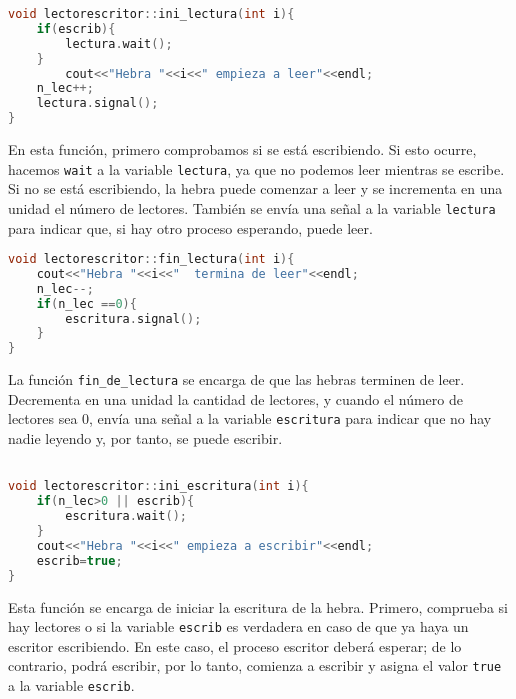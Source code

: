 \documentclass{article}
\begin{document}
\begin{lstlisting}[language=C++,caption=función inicio de lectura] 
void lectorescritor::ini_lectura(int i){
	if(escrib){
		lectura.wait();
	}
		cout<<"Hebra "<<i<<" empieza a leer"<<endl;
	n_lec++;
	lectura.signal();
}
\end{lstlisting}

En esta función, primero comprobamos si se está escribiendo. Si esto ocurre, hacemos \texttt{wait} a la variable \texttt{lectura}, ya que no podemos leer mientras se escribe. Si no se está escribiendo, la hebra puede comenzar a leer y se incrementa en una unidad el número de lectores. También se envía una señal a la variable \texttt{lectura} para indicar que, si hay otro proceso esperando, puede leer.

\begin{lstlisting}[language=C++,caption=función fin de lectura] 
void lectorescritor::fin_lectura(int i){
	cout<<"Hebra "<<i<<"  termina de leer"<<endl;
	n_lec--;
	if(n_lec ==0){
		escritura.signal();
	}
}
\end{lstlisting}
La función \texttt{fin\_de\_lectura} se encarga de que las hebras terminen de leer. Decrementa en una unidad la cantidad de lectores, y cuando el número de lectores sea 0, envía una señal a la variable \texttt{escritura} para indicar que no hay nadie leyendo y, por tanto, se puede escribir.


\begin{lstlisting}[language=C++,caption=función inicio de escritura ] 

void lectorescritor::ini_escritura(int i){
	if(n_lec>0 || escrib){
		escritura.wait();
	}
	cout<<"Hebra "<<i<<" empieza a escribir"<<endl;
	escrib=true;
}
\end{lstlisting}
Esta función se encarga de iniciar la escritura de la hebra. Primero, comprueba si hay lectores o si la variable \texttt{escrib} es verdadera en caso de que ya haya un escritor escribiendo. En este caso, el proceso escritor deberá esperar; de lo contrario, podrá escribir, por lo tanto, comienza a escribir y asigna el valor \texttt{true} a la variable \texttt{escrib}.
\end{document}
